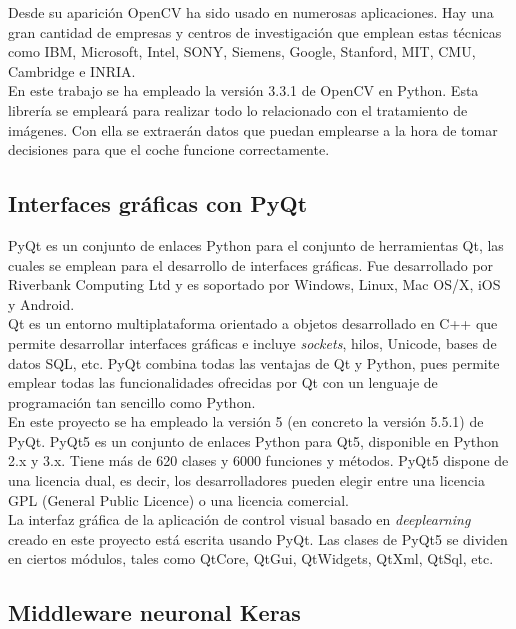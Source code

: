 Desde su aparición OpenCV ha sido usado en numerosas aplicaciones. Hay una gran cantidad de empresas y centros de investigación que emplean estas técnicas como IBM, Microsoft, Intel, SONY, Siemens, Google, Stanford, MIT, CMU, Cambridge e INRIA.\\

En este trabajo se ha empleado la versión 3.3.1 de OpenCV en Python. Esta librería se empleará para realizar todo lo relacionado con el tratamiento de imágenes. Con ella se extraerán datos que puedan emplearse a la hora de tomar decisiones para que el coche funcione correctamente.


\subsection{Interfaces gráficas con PyQt}

PyQt \cite{pyqt} \cite{pyqt1} es un conjunto de enlaces Python para el conjunto de herramientas Qt, las cuales se emplean para el desarrollo de interfaces gráficas. Fue desarrollado por Riverbank Computing Ltd y es soportado por Windows, Linux, Mac OS/X, iOS y Android.\\

Qt es un entorno multiplataforma orientado a objetos desarrollado en C++ que permite desarrollar interfaces gráficas e incluye \textit{sockets}, hilos, Unicode, bases de datos SQL, etc. PyQt combina todas las ventajas de Qt y Python, pues permite emplear todas las funcionalidades ofrecidas por Qt con un lenguaje de programación tan sencillo como Python.\\

En este proyecto se ha empleado la versión 5 (en concreto la versión 5.5.1) de PyQt. PyQt5 es un conjunto de enlaces Python para Qt5, disponible en Python 2.x y 3.x. Tiene más de 620 clases y 6000 funciones y métodos. PyQt5 dispone de una licencia dual, es decir, los desarrolladores pueden elegir entre una licencia GPL (General Public Licence) o una licencia comercial. \\

La interfaz gráfica de la aplicación de control visual basado en \textit{deeplearning} creado en este proyecto está escrita usando PyQt. Las clases de PyQt5 se dividen en ciertos módulos, tales como QtCore, QtGui, QtWidgets, QtXml, QtSql, etc. 


\subsection{Middleware neuronal Keras}

